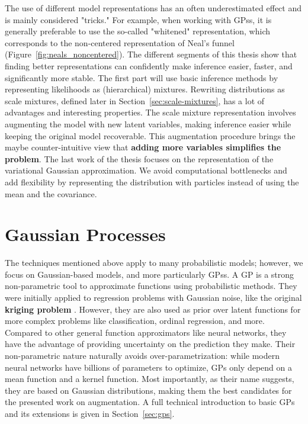 The use of different model representations has an often underestimated effect and is mainly considered "tricks."
For example, when working with \aclp{GPs}, it is generally preferable to use the so-called "whitened" representation, which corresponds to the non-centered representation of Neal's funnel (Figure~\ref{fig:neals_noncentered}).
The different segments of this thesis show that finding better representations can confidently make inference easier, faster, and significantly more stable. 
The first part will use basic inference methods by representing likelihoods as (hierarchical) mixtures.
Rewriting distributions as scale mixtures, defined later in Section~\ref{sec:scale-mixtures}, has a lot of advantages and interesting properties.
The scale mixture representation involves augmenting the model with new latent variables, making inference easier while keeping the original model recoverable.
This augmentation procedure brings the maybe counter-intuitive view that \textbf{adding more variables simplifies the problem}.
The last work of the thesis focuses on the representation of the variational Gaussian approximation.
We avoid computational bottlenecks and add flexibility by representing the distribution with particles instead of using the mean and the covariance.

\section{Gaussian Processes}

The techniques mentioned above apply to many probabilistic models; however, we focus on Gaussian-based models, and more particularly \acfp{GPs}.
A \ac{GP} is a strong non-parametric tool to approximate functions using probabilistic methods.
They were initially applied to regression problems with Gaussian noise, like the original \textbf{kriging problem} \cite{cressie1990origins}.
However, they are also used as prior over latent functions for more complex problems like classification, ordinal regression, and more.
Compared to other general function approximators like neural networks, they have the advantage of providing uncertainty on the prediction they make.
Their non-parametric nature naturally avoids over-parametrization: while modern neural networks have billions of parameters to optimize, \acp{GP} only depend on a mean function and a kernel function.
Most importantly, as their name suggests, they are based on Gaussian distributions, making them the best candidates for the presented work on augmentation.
A full technical introduction to basic \acp{GP} and its extensions is given in Section~\ref{sec:gps}.


